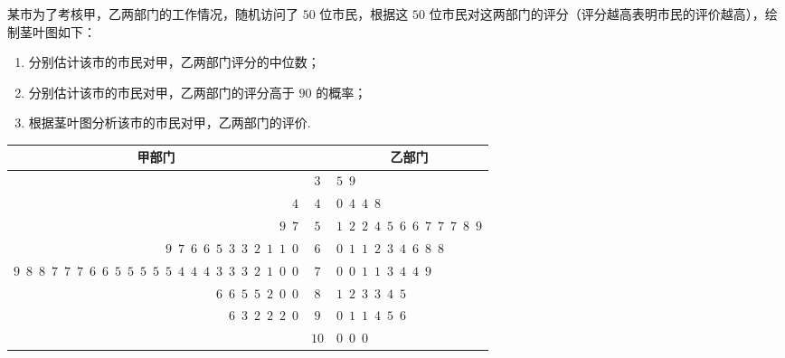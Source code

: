 \begin{problem}
某市为了考核甲，乙两部门的工作情况，随机访问了 \(50\) 位市民，根据这 \(50\) 位市民对这两部门的评分（评分越高表明市民的评价越高），绘制茎叶图如下：

\begin{enumerate}
\item 分别估计该市的市民对甲，乙两部门评分的中位数；
\item 分别估计该市的市民对甲，乙两部门的评分高于 \(90\) 的概率；
\item 根据茎叶图分析该市的市民对甲，乙两部门的评价.
\end{enumerate}

\begin{center}
\renewcommand{\arraystretch}{1.3}
\begin{tabular}{r|c|l}
\multicolumn{1}{c|}{甲部门} & \multicolumn{1}{c|}{} & \multicolumn{1}{c}{乙部门} \\
\hline
 & \(3\) & \(5\enspace 9\) \\
\(4\) & \(4\) & \(0\enspace 4\enspace 4\enspace 8\) \\
\(9\enspace 7\) & \(5\) & \(1\enspace 2\enspace 2\enspace 4\enspace 5\enspace 6\enspace 6\enspace 7\enspace 7\enspace 7\enspace 8\enspace 9\) \\
\(9\enspace 7\enspace 6\enspace 6\enspace 5\enspace 3\enspace 3\enspace 2\enspace 1\enspace 1\enspace 0\) & \(6\) & \(0\enspace 1\enspace 1\enspace 2\enspace 3\enspace 4\enspace 6\enspace 8\enspace 8\) \\
\(9\enspace 8\enspace 8\enspace 7\enspace 7\enspace 7\enspace 6\enspace 6\enspace 5\enspace 5\enspace 5\enspace 5\enspace 5\enspace 4\enspace 4\enspace 4\enspace 3\enspace 3\enspace 3\enspace 2\enspace 1\enspace 0\enspace 0\) & \(7\) & \(0\enspace 0\enspace 1\enspace 1\enspace 3\enspace 4\enspace 4\enspace 9\) \\
\(6\enspace 6\enspace 5\enspace 5\enspace 2\enspace 0\enspace 0\) & \(8\) & \(1\enspace 2\enspace 3\enspace 3\enspace 4\enspace 5\) \\
\(6\enspace 3\enspace 2\enspace 2\enspace 2\enspace 0\) & \(9\) & \(0\enspace 1\enspace 1\enspace 4\enspace 5\enspace 6\) \\
 & \(10\) & \(0\enspace 0\enspace 0\)
\end{tabular}
\end{center}
\end{problem}

